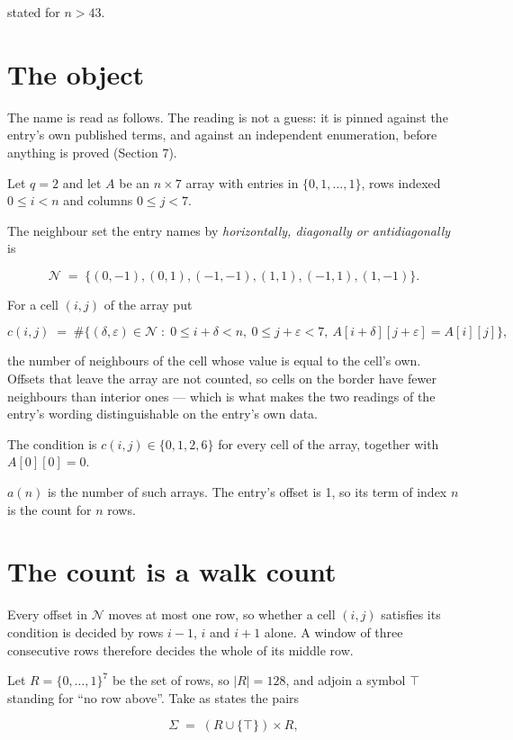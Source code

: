 \documentclass[11pt]{article}
\theoremstyle{definition}
\begin{document}
stated for $n > 43$.

\section{The object}

The name is read as follows. The reading is not a guess: it is pinned against the entry's own published terms, and against an independent enumeration, before anything is proved (Section 7).

Let $q = 2$ and let $A$ be an $n \times 7$ array with entries in $\{0,1,\dots,1\}$, rows indexed $0 \le i < n$ and columns $0 \le j < 7$.

The neighbour set the entry names by {\itshape horizontally, diagonally or antidiagonally} is

\[\mathcal{N} \;=\; \{(0,-1), (0,1), (-1,-1), (1,1), (-1,1), (1,-1)\}.\]

For a cell $(i,j)$ of the array put

\[c(i,j) \;=\; \#\bigl\{(\delta,\varepsilon)\in\mathcal{N} \;:\; 0\le i+\delta<n,\ 0\le j+\varepsilon<7,\ A[i+\delta][j+\varepsilon] = A[i][j]\bigr\},\]

the number of neighbours of the cell whose value is equal to the cell's own. Offsets that leave the array are not counted, so cells on the border have fewer neighbours than interior ones --- which is what makes the two readings of the entry's wording distinguishable on the entry's own data.

The condition is $c(i,j) \in \{0, 1, 2, 6\}$ for every cell of the array, together with $A[0][0]=0$.

$a(n)$ is the number of such arrays. The entry's offset is 1, so its term of index $n$ is the count for $n$ rows.

\section{The count is a walk count}

Every offset in $\mathcal{N}$ moves at most one row, so whether a cell $(i,j)$ satisfies its condition is decided by rows $i-1$, $i$ and $i+1$ alone. A window of three consecutive rows therefore decides the whole of its middle row.

Let $R = \{0,\dots,1\}^{7}$ be the set of rows, so $|R| = 128$, and adjoin a symbol $\top$ standing for ``no row above''. Take as states the pairs

\[\Sigma \;=\; (R \cup \{\top\}) \times R,\]
\end{document}
